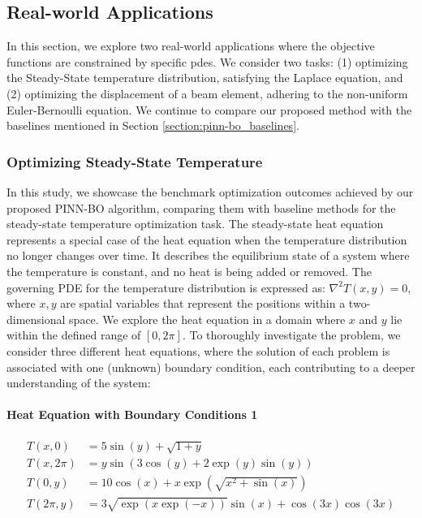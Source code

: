 \subsection{Real-world Applications}
In this section, we explore two real-world applications where the objective functions are constrained by specific \acp{pde}. We consider two tasks: (1) optimizing the Steady-State temperature distribution, satisfying the  Laplace equation, and (2) optimizing the displacement of a beam element, adhering to the non-uniform Euler-Bernoulli equation. We continue to compare our proposed method with the baselines mentioned in Section \ref{section:pinn-bo_baselines}. 
\subsubsection{Optimizing Steady-State Temperature}
\label{section:pinn-bo_experiments_2d_laplace}
In this study, we showcase the benchmark optimization outcomes achieved by our proposed PINN-BO algorithm, comparing them with baseline methods for the steady-state temperature optimization task. The steady-state heat equation represents a special case of the heat equation when the temperature distribution no longer changes over time. It describes the equilibrium state of a system where the temperature is constant, and no heat is being added or removed.  The governing PDE for the temperature distribution is expressed as: $\nabla^2 T(x, y) = 0$, where $x, y$ are spatial variables that represent the positions within a two-dimensional space. We explore the heat equation in a domain where $x$ and $y$ lie within the defined range of $[0,2\pi]$. To thoroughly investigate the problem, we consider three different heat equations, where the solution of each problem is associated with one (unknown) boundary condition, each contributing to a deeper understanding of the system: 





 \paragraph{Heat Equation with Boundary Conditions 1}
 \label{para:heat1}
 \begin{align*}
     T(x, 0) &= 5\sin(y) + \sqrt{1+y} \\
    T(x, 2\pi) &= y\sin\left(3\cos(y) + 2\exp(y)\sin(y)\right) \\
   T(0, y) &= 10\cos(x) + x\exp(\sqrt{x^2 + \sin(x)}) \\
   T(2\pi, y) &= 3\sqrt{\exp(x\exp(-x))}\sin(x) + \cos(3x)\cos(3x)
 \end{align*}
